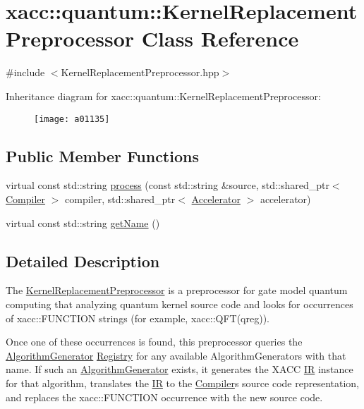 \hypertarget{a01135}{}\section{xacc\+:\+:quantum\+:\+:Kernel\+Replacement\+Preprocessor Class Reference}
\label{a01135}


{\ttfamily \#include $<$Kernel\+Replacement\+Preprocessor.\+hpp$>$}

Inheritance diagram for xacc\+:\+:quantum\+:\+:Kernel\+Replacement\+Preprocessor\+:\begin{figure}[H]
\begin{center}
\leavevmode
\texttt{[image: a01135]}
\end{center}
\end{figure}
\subsection*{Public Member Functions}
\begin{DoxyCompactItemize}
\item 
virtual const std\+::string \hyperlink{a01135_ad4f9ba1f83ea45ed376f36e3853c668d}{process} (const std\+::string \&source, std\+::shared\+\_\+ptr$<$ \hyperlink{a01451}{Compiler} $>$ compiler, std\+::shared\+\_\+ptr$<$ \hyperlink{a01435}{Accelerator} $>$ accelerator)
\item 
virtual const std\+::string \hyperlink{a01135_af74db6b7f3adeb7d203777f5ce450491}{get\+Name} ()
\end{DoxyCompactItemize}


\subsection{Detailed Description}
The \hyperlink{a01135}{Kernel\+Replacement\+Preprocessor} is a preprocessor for gate model quantum computing that analyzing quantum kernel source code and looks for occurrences of \textquotesingle{}xacc\+::\+F\+U\+N\+C\+T\+I\+ON\textquotesingle{} strings (for example, xacc\+::\+Q\+F\+T(qreg)).

Once one of these occurrences is found, this preprocessor queries the \hyperlink{a01467}{Algorithm\+Generator} \hyperlink{a01547}{Registry} for any available Algorithm\+Generators with that name. If such an \hyperlink{a01467}{Algorithm\+Generator} exists, it generates the X\+A\+CC \hyperlink{a01499}{IR} instance for that algorithm, translates the \hyperlink{a01499}{IR} to the \hyperlink{a01451}{Compiler}\textquotesingle{}s source code representation, and replaces the \textquotesingle{}xacc\+::\+F\+U\+N\+C\+T\+I\+ON\textquotesingle{} occurrence with the new source code. 

